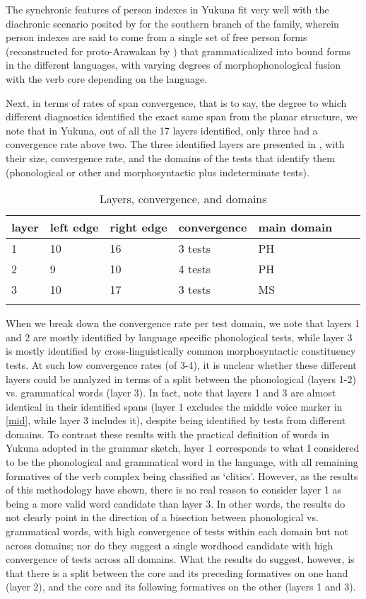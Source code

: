 \documentclass[output=paper]{langscibook}
\begin{document}
The synchronic features of person indexes in Yukuna fit very well with the diachronic scenario posited by \citet{danielsen2011} for the southern branch of the family, wherein person indexes are said to come from a single set of free person forms (reconstructed for proto-Arawakan by \citealt{payne1991}) that grammaticalized into bound forms in the different languages, with varying degrees of morphophonological fusion with the verb core depending on the language.

Next, in terms of rates of span convergence, that is to say, the degree to which different diagnostics identified the exact same span from the planar structure, we note that in Yukuna, out of all the 17 layers identified, only three had a convergence rate above two. The three identified layers are presented in , with their size, convergence rate, and the domains of the tests that identify them (phonological or other and morphosyntactic plus indeterminate tests).

\begin{table}
	\caption{Layers, convergence, and domains}
	\label{tab:layers}
\begin{tabular}{lllllll} \lsptoprule
   layer & left edge & right edge & convergence &  main domain   \\ \midrule
	1 & 10 & 16  & 3 tests & PH \\
	2 & 9 & 10 & 4 tests & PH \\
	3 & 10 & 17  & 3 tests & MS \\
	\lspbottomrule
\end{tabular}
\end{table}

When we break down the convergence rate per test domain, we note that layers 1 and 2 are mostly identified by language specific phonological tests, while layer 3 is mostly identified by cross-linguistically common morphosyntactic constituency tests. At such low convergence rates (of 3-4), it is unclear whether these different layers could be analyzed in terms of a split between the phonological (layers 1-2) vs. grammatical words  (layer 3). In fact, note that layers 1 and 3 are almost identical in their identified spans (layer 1 excludes the middle voice marker in \ref{mid}, while layer 3 includes it), despite being identified by tests from different domains. 
To contrast these results with the practical definition of words in Yukuna adopted in the grammar sketch, layer 1 corresponds to what I considered to be the phonological and grammatical word in the language, with all remaining formatives of the verb complex being classified as `clitics'. However, as the results of this methodology have shown, there is no real reason to consider layer 1 as being a more valid word candidate than layer 3. In other words, the results do not clearly point in the direction of a  bisection between phonological vs. grammatical words, with high convergence of tests within each domain but not across domains; nor do they suggest a single wordhood candidate with high convergence of tests across all domains. What the results do suggest, however, is that there is a split between the core and its preceding formatives on one hand (layer 2), and the core and its following formatives on the other (layers 1 and 3). 
\end{document}
